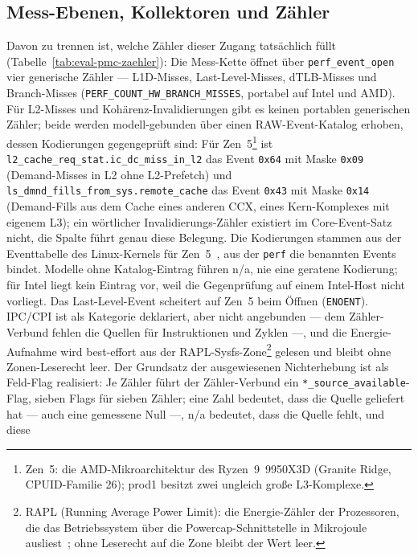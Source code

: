 \begin{nurlang}
\subsection{Mess-Ebenen, Kollektoren und Zähler}\label{sec:eval-counters}
Davon zu trennen ist, welche Zähler dieser Zugang tatsächlich füllt
(Tabelle~\ref{tab:eval-pmc-zaehler}): Die Mess-Kette öffnet über
\texttt{perf\_event\_open}~\cite{linux_perf_event_open,demelo2010perf} vier generische Zähler ---
L1D-Misses, Last-Level-Misses, dTLB-Misses und Branch-Misses
(\texttt{PERF\_COUNT\_HW\_BRANCH\_MISSES}, portabel auf Intel und AMD). Für L2-Misses und
Kohärenz-Invalidierungen gibt es keinen portablen generischen Zähler; beide werden modell-gebunden über
einen RAW-Event-Katalog erhoben, dessen Kodierungen gegengeprüft sind: Für
Zen~5\footnote{Zen~5: die AMD-Mikroarchitektur des Ryzen~9~9950X3D (Granite Ridge, CPUID-Familie 26); %
prod1 besitzt zwei ungleich große L3-Komplexe.} ist \texttt{l2\_cache\_req\_stat.ic\_dc\_miss\_in\_l2} das
Event \texttt{0x64} mit Maske \texttt{0x09} (Demand-Misses in L2 ohne L2-Prefetch) und %
\texttt{ls\_dmnd\_fills\_from\_sys.remote\_cache} das Event \texttt{0x43} mit Maske \texttt{0x14} %
(Demand-Fills aus dem Cache eines anderen CCX, eines Kern-Komplexes mit eigenem L3); ein wörtlicher
Invalidierungs-Zähler existiert im Core-Event-Satz nicht, die Spalte führt genau diese Belegung. Die
Kodierungen stammen aus der Eventtabelle des Linux-Kernels für Zen~5~\cite{linux_perf_amdzen5}, aus
der \texttt{perf} die benannten Events bindet. Modelle ohne Katalog-Eintrag führen n/a, nie eine
geratene Kodierung; für Intel liegt kein Eintrag vor, weil die Gegenprüfung auf einem Intel-Host
nicht vorliegt. Das Last-Level-Event scheitert auf Zen~5 beim Öffnen (\texttt{ENOENT}). IPC/CPI ist als
Kategorie deklariert, aber nicht angebunden --- dem Zähler-Verbund fehlen die Quellen für Instruktionen
und Zyklen ---, und die Energie-Aufnahme wird best-effort aus der RAPL-Sysfs-Zone\footnote{RAPL
(Running Average Power Limit): die Energie-Zähler der Prozessoren, die das Betriebssystem über die
Powercap-Schnittstelle in Mikrojoule ausliest~\cite{david2010rapl,khan2018rapl}; ohne Leserecht auf
die Zone bleibt der Wert leer.} gelesen und bleibt ohne Zonen-Leserecht leer. Der Grundsatz der ausgewiesenen Nichterhebung
ist als Feld-Flag realisiert: Je Zähler führt der Zähler-Verbund ein
\texttt{*\_source\_available}-Flag, sieben Flags für sieben Zähler; eine Zahl bedeutet, dass die
Quelle geliefert hat --- auch eine gemessene Null ---, n/a bedeutet, dass die Quelle fehlt, und diese

\end{nurlang}
